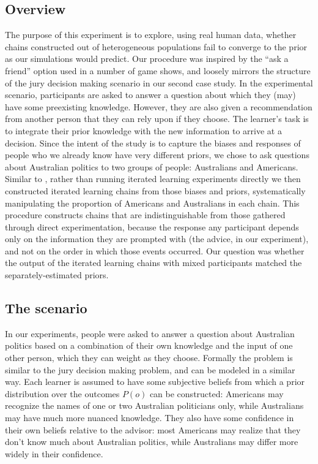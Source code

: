 \documentclass[doc]{apa6}
\begin{document}
\subsection{Overview}

The purpose of this experiment is to explore, using real human data, whether chains constructed out of heterogeneous populations fail to converge to the prior as our simulations would predict. Our procedure was inspired by the ``ask a friend'' option used in a number of game shows, and loosely mirrors the structure of the jury decision making scenario in our second case study. In the experimental scenario, participants are asked to answer a question about which they (may) have some preexisting knowledge. However, they are also given a recommendation from another person that they can rely upon if they choose. The learner's task is to integrate their prior knowledge with the new information to arrive at a decision. Since the intent of the study is to capture the biases and responses of people who we already know have very different priors, we chose to ask questions about Australian politics to two groups of people: Australians and Americans. Similar to \textcite{ferdinandetal13}, rather than running iterated learning experiments directly we then constructed iterated learning chains from those biases and priors, systematically manipulating the proportion of Americans and Australians in each chain. This procedure constructs chains that are indistinguishable from those gathered through direct experimentation, because the response any participant depends only on the information they are prompted with (the advice, in our experiment), and not on the order in which those events occurred. Our question was whether the output of the iterated learning chains with mixed participants matched the separately-estimated priors.

\subsection{The scenario}

In our experiments, people were asked to answer a question about Australian politics based on a combination of their own knowledge and the input of one other person, which they can weight as they choose. Formally the problem is similar to the jury decision making problem, and can be modeled in a similar way. Each learner is assumed to have some subjective beliefs from which a prior distribution over the outcomes $P(o)$ can be constructed: Americans may recognize the names of one or two Australian politicians only, while Australians may have much more nuanced knowledge. They also have some confidence in their own beliefs relative to the advisor: most Americans may realize that they don't know much about Australian politics, while Australians may differ more widely in their confidence.
\end{document}
